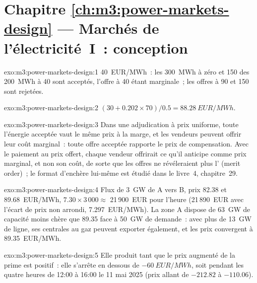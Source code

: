 \section*{Chapitre \ref{ch:m3:power-markets-design} --- Marchés de l'électricité~I~: conception}

\begin{solution}{exo:m3:power-markets-design:1}
\qty{40}{EUR/MWh}~: les 300~MWh à zéro et 150 des 200~MWh à 40 sont acceptés, l'offre
à 40 étant marginale~; les offres à 90 et 150 sont rejetées.
\end{solution}

\begin{solution}{exo:m3:power-markets-design:2}
$(30 + 0.202 \times 70)/0.5 = \qty{88.28}{EUR/MWh}$.
\end{solution}

\begin{solution}{exo:m3:power-markets-design:3}
Dans une adjudication à prix uniforme, toute l'énergie acceptée vaut le même prix à la marge, et
les vendeurs peuvent offrir leur coût marginal~: toute offre acceptée rapporte le prix de compensation.
Avec le paiement au prix offert, chaque vendeur offrirait ce qu'il anticipe comme prix marginal, et non son
coût, de sorte que les offres ne révéleraient plus l' (merit order)~; le format d'enchère lui-même est
étudié dans le livre~4, chapitre~29.
\end{solution}

\begin{solution}{exo:m3:power-markets-design:4}
Flux de 3~GW de A vers B, prix \qty{82.38}{} et \qty{89.68}{EUR/MWh},  $7.30 \times
3\,000 \approx$ 21\,900~EUR pour l'heure (21\,890~EUR avec l'écart de prix non arrondi,
\qty{7.297}{EUR/MWh}). La zone A dispose de 63~GW de capacité moins chère que
\qty{89.35}{} face à 50~GW de demande~: avec plus de 13~GW de ligne, ses centrales au gaz peuvent
exporter également, et les prix convergent à \qty{89.35}{EUR/MWh}.
\end{solution}

\begin{solution}{exo:m3:power-markets-design:5}
Elle produit tant que le prix augmenté de la prime est positif~: elle s'arrête en dessous de
$-\qty{60}{EUR/MWh}$, soit pendant les quatre heures de 12:00 à 16:00 le 11 mai 2025
(prix allant de $-212.82$ à $-110.06$).
\end{solution}

